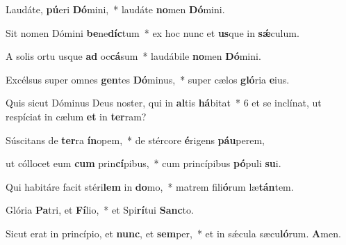 \item Laudáte, \textbf{pú}eri \textbf{Dó}mini,~* laudáte \textbf{no}men \textbf{Dó}mini.

\item Sit nomen Dómini \textbf{be}ne\textbf{díc}tum~* ex hoc nunc et \textbf{us}que in \textbf{sǽ}culum.

\item A solis ortu usque \textbf{ad} oc\textbf{cá}sum~* laudábile \textbf{no}men \textbf{Dó}mini.

\item Excélsus super omnes \textbf{gen}tes \textbf{Dó}minus,~* super cælos \textbf{gló}ria \textbf{e}ius.

\item Quis sicut Dóminus Deus noster, qui in \textbf{al}tis \textbf{há}bitat~* 6 et se inclínat, ut respíciat in cælum \textbf{et} in \textbf{ter}ram?

\item Súscitans de \textbf{ter}ra \textbf{ín}opem,~* de stércore \textbf{é}rigens \textbf{páu}perem,

\item ut cóllocet eum \textbf{cum} prin\textbf{cí}pibus,~* cum princípibus \textbf{pó}puli \textbf{su}i.

\item Qui habitáre facit stéri\textbf{lem} in \textbf{do}mo,~* matrem fili\textbf{ó}rum læ\textbf{tán}tem.

\item Glória \textbf{Pa}tri, et \textbf{Fí}lio,~* et Spi\textbf{rí}tui \textbf{Sanc}to.

\item Sicut erat in princípio, et \textbf{nunc}, et \textbf{sem}per,~* et in sǽcula sæcu\textbf{ló}rum. \textbf{A}men.